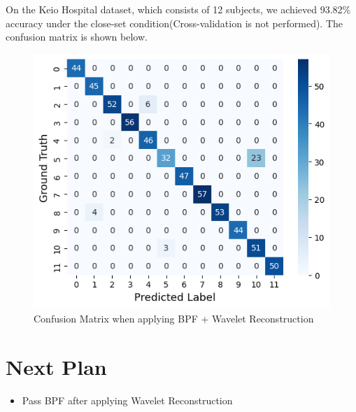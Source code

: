 \documentclass[dvipdfmx]{article}
\begin{document}
On the Keio Hospital dataset, which consists of 12 subjects, we achieved 93.82\% accuracy under the close-set condition(Cross-validation is not performed). The confusion matrix is shown below.

\begin{figure}[H]
\begin{center}
\includegraphics[width=0.8\linewidth]{./img/conf_bpf_wavelet.png}
\end{center}
\caption{Confusion Matrix when applying BPF + Wavelet Reconstruction}
\end{figure}

\section{Next Plan}
\begin{itemize}
    \item Pass BPF after applying Wavelet Reconstruction
\end{itemize}
\end{document}
